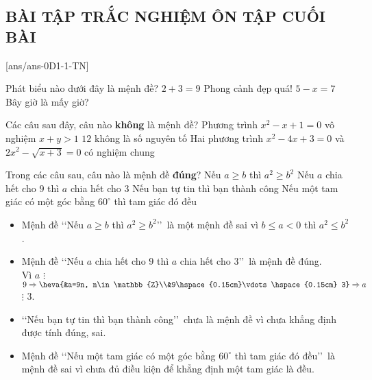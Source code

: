 \subsection{BÀI TẬP TRẮC NGHIỆM ÔN TẬP CUỐI BÀI}

[ans/ans-0D1-1-TN]

\begin{ex}%
	Phát biểu nào dưới đây là mệnh đề?
	\choice
	{\True $2+3=9$}
	{Phong cảnh đẹp quá!}
	{$5-x=7$}
	{Bây giờ là mấy giờ?}
\end{ex}
\begin{ex}%
	Các câu sau đây, câu nào {\bf không} là mệnh đề?
	\choice
	{Phương trình $ x^2-x+1=0$ vô nghiệm}
	{\True $x+y>1$}
	{$12$ không là số nguyên tố}
	{Hai phương trình $ x^2-4x+3=0$ và $ 2x^2-\sqrt{x+3}=0$ có nghiệm chung}
\end{ex}
\begin{ex}%
	Trong các câu sau, câu nào là mệnh đề \textbf{đúng}?
	\choice
	{Nếu $a\ge b$ thì $a^2\ge b^2$}
	{\True Nếu $a$ chia hết cho $9$ thì $a$ chia hết cho $3$}
	{Nếu bạn tự tin thì bạn thành công}
	{Nếu một tam giác có một góc bằng $60^\circ $ thì tam giác đó đều}
	\loigiai
	{
		\begin{itemize}
			\item Mệnh đề \lq\lq Nếu $a\ge b$ thì $a^2\ge b^2$\rq\rq\ là một mệnh đề sai vì $b\le a < 0$ thì $a^2\le b^2$ .
			\item Mệnh đề \lq\lq Nếu $a$ chia hết cho $9$ thì $a$ chia hết cho $3$\rq\rq\ là mệnh đề đúng.\\
			Vì $a$ $\vdots$ $9\Rightarrow \heva{&a=9n, n\in \mathbb{Z}\\&9\hspace{0.15cm}\vdots\hspace{0.15cm} 3}\Rightarrow a$ $\vdots$  $3$.
			\item \lq\lq Nếu bạn tự tin thì bạn thành công\rq\rq\ chưa là mệnh đề vì chưa khẳng định được tính đúng, sai.
			\item Mệnh đề \lq\lq Nếu một tam giác có một góc bằng $60^\circ $ thì tam giác đó đều\rq\rq\ là mệnh đề sai vì chưa đủ điều kiện để khẳng định một tam giác là đều.
		\end{itemize}
	}
\end{ex}
